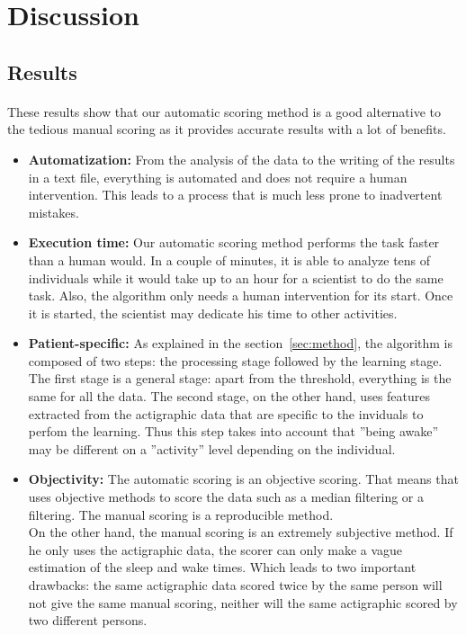 \documentclass[a4paper,12pt]{article}
\begin{document}
\newpage

\section{Discussion}

\subsection{Results}

\paragraph{}
These results show that our automatic scoring method is a good alternative to the tedious manual scoring as it provides accurate results with a lot of benefits.

\begin{itemize}
\item \textbf{Automatization:} From the analysis of the data to the writing of the results in a text file, everything is automated and does not require a human intervention. This leads to a process that is much less prone to inadvertent mistakes.

\item \textbf{Execution time:} Our automatic scoring method performs the task faster than a human would. In a couple of minutes, it is able to analyze tens of individuals while it would take up to an hour for a scientist to do the same task. Also, the algorithm only needs a human intervention for its start. Once it is started, the scientist may dedicate his time to other activities.

\item \textbf{Patient-specific:} As explained in the section~\ref{sec:method}, the algorithm is composed of two steps: the processing stage followed by the learning stage. The first stage is a general stage: apart from the threshold, everything is the same for all the data. The second stage, on the other hand, uses features extracted from the actigraphic data that are specific to the inviduals to perfom the learning. Thus this step takes into account that ''being awake'' may be different on a ''activity'' level depending on the individual.

\item \textbf{Objectivity:} The automatic scoring is an objective scoring. That means that uses objective methods to score the data such as a median filtering or a filtering. The manual scoring is a reproducible method. \\ On the other hand, the manual scoring is an extremely subjective method. If he only uses the actigraphic data, the scorer can only make a vague estimation of the sleep and wake times. Which leads to two important drawbacks: the same actigraphic data scored twice by the same person will not give the same manual scoring, neither will the same actigraphic scored by two different persons.
\end{itemize}
\end{document}
